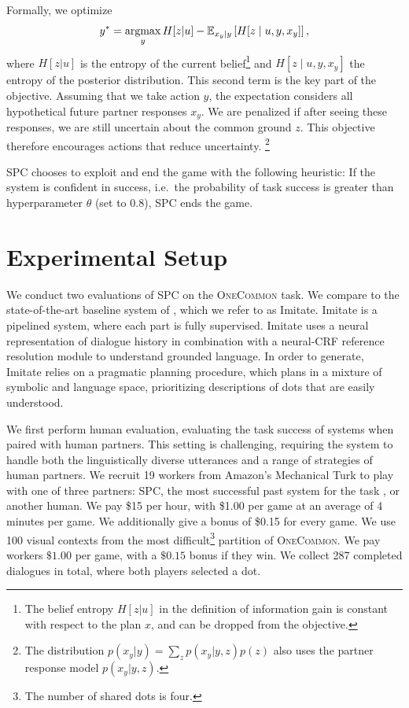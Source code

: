 \documentclass[11pt]{article}
\newcommand{\system}{SPC}
\begin{document}
Formally, we optimize
\begin{equation}
\label{eqn:eig}
y^* = \operatorname*{argmax}_y H[z|u] - \mathbb{E}_{x_y \mid y}\left[H[z \mid u,y,x_y]\right],
\end{equation}
where $H[z|u]$ is the entropy of the current belief\footnote{The belief entropy $H[z|u]$ in the definition of information gain is constant with respect to the plan $x$, and can be dropped from the objective.}
and $H[z\mid u,y,x_y]$ the  entropy of the posterior distribution. 
This second term is the key part of the objective. Assuming that we take action $y$, the expectation considers all hypothetical future partner responses $x_y$. We are penalized if after seeing these responses, we are still uncertain about the common ground $z$. This objective therefore encourages actions that reduce uncertainty. \footnote{
The distribution $p(x_y|y)=\sum_z p(x_y|y,z)p(z)$
also uses the partner response model $p(x_y|y,z)$.
}

\system{} chooses to exploit and end the game with the following heuristic:
If the system is confident in success, i.e.\ the probability of task success is greater than hyperparameter $\theta$ (set to $0.8$), \system{} ends the game.

\section{Experimental Setup}
\label{sec:experimental-setup}
We conduct two evaluations of \system{} on the \textsc{OneCommon} task. We compare to the state-of-the-art baseline system of \citet{fried}, which we refer to as Imitate.
Imitate is a pipelined system, where each part is fully supervised. Imitate uses a neural representation of dialogue history in combination with a neural-CRF reference resolution module to understand grounded language. In order to generate, Imitate relies on a pragmatic planning procedure, which plans in a mixture of symbolic and language space, prioritizing descriptions of dots that are easily understood.

We first perform human evaluation, evaluating the task success of systems when paired with human partners. This setting is challenging, requiring the system to handle both the linguistically diverse utterances and a range of strategies of human partners.
We recruit 19 workers from Amazon's Mechanical Turk to play with one of three partners: \system{}, the most successful past system for the task \citep{fried}, or another human.
We pay \$15 per hour, with \$1.00 per game at an average of 4 minutes per game. We additionally give a bonus of \$0.15 for every game.
We use 100 visual contexts from the most difficult\footnote{The number of shared dots is four.} partition of \textsc{OneCommon}.
We pay workers $\$1.00$ per game, with a $\$0.15$ bonus if they win.
We collect 287 completed dialogues in total, where both players selected a dot.
\end{document}
